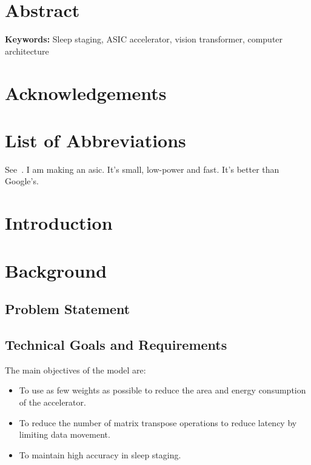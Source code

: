 \documentclass[12pt, hidelinks]{article}
\begin{document}

\maketitle



\onehalfspacing


\newpage

\section*{Abstract}
    \lipsum[1]
\newline
\newline
{\bf Keywords:} Sleep staging, ASIC accelerator, vision transformer, computer architecture
\newpage

\section*{Acknowledgements}

\newpage

\tableofcontents
\newpage

\listoffigures
\newpage

\listoftables
\newpage

\section*{List of Abbreviations}

\newpage

    See~\cite{liu2021edge}.
    I am making an \ac{asic}. It's small, low-power and fast. It's better than Google's.
\section{Introduction}
\lipsum[1]

\newpage
\section{Background}
\subsection{Problem Statement}
\lipsum[1]
\subsection{Technical Goals and Requirements}
\label{sec:reqs}
The main objectives of the
model are:
\begin{itemize}
    \item To use as few weights as possible to reduce the area and energy consumption of the accelerator.
    \item To reduce the number of matrix transpose operations to reduce latency by limiting data movement.
    \item To maintain high accuracy in sleep staging.
\end{itemize}
\lipsum[1]
\end{document}

